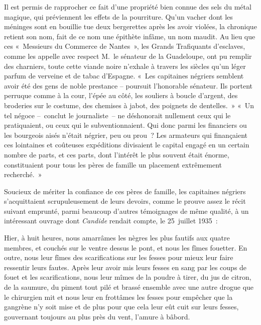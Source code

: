 \documentclass[french,twoside]{book} %
\newenvironment{quoteblock}%
  {\begin{quoting}}
  {\end{quoting}}
\newenvironment{quotebar}{%
    \def\FrameCommand{{\color{rubric!10!}\vrule width 0.5em} \hspace{0.9em}}%
    \def\OuterFrameSep{\itemsep} %
    \MakeFramed {\advance\hsize-\width \FrameRestore}
  }%
  {%
    \endMakeFramed
  }
\renewenvironment{quoteblock}%
  {%
    \savenotes
    \setstretch{0.9}
    \normalfont
    \begin{quotebar}
  }
  {%
    \end{quotebar}
    \spewnotes
  }
\begin{document}
Il est permis de rapprocher ce fait d’une propriété bien connue des sels du métal magique, qui préviennent les effets de la pourriture. Qu’un vacher dont les méninges sont en bouillie tue deux bergerettes après les avoir violées, la chronique retient son nom, fait de ce nom une épithète infâme, un nom maudit. Au lieu que ces « Messieurs du Commerce de Nantes », les Grands Trafiquants d’esclaves, comme les appelle avec respect M. le sénateur de la Guadeloupe, ont pu remplir des charniers, toute cette viande noire n’exhale à travers les siècles qu’un léger parfum de verveine et de tabac d’Espagne. « Les capitaines négriers semblent avoir été des gens de noble prestance – poursuit l’honorable sénateur. Ils portent perruque comme à la cour, l’épée au côté, les souliers à boucle d’argent, des broderies sur le costume, des chemises à jabot, des poignets de dentelles. » « Un tel négoce – conclut le journaliste – ne déshonorait nullement ceux qui le pratiquaient, ou ceux qui le subventionnaient. Qui donc parmi les financiers ou les bourgeois aisés n’était négrier, peu ou prou ? Les armateurs qui finançaient ces lointaines et coûteuses expéditions divisaient le capital engagé en un certain nombre de parts, et ces parts, dont l’intérêt le plus souvent était énorme, constituaient pour tous les pères de famille un placement extrêmement recherché. »\par
Soucieux de mériter la confiance de ces pères de famille, les capitaines négriers s’acquittaient scrupuleusement de leurs devoirs, comme le prouve assez le récit suivant emprunté, parmi beaucoup d’autres témoignages de même qualité, à un intéressant ouvrage dont \emph{Candide} rendait compte, le 25 juillet 1935 :\par

\begin{quoteblock}
 \noindent Hier, à huit heures, nous amarrâmes les nègres les plus fautifs aux quatre membres, et couchés sur le ventre dessus le pont, et nous les fîmes fouetter. En outre, nous leur fîmes des scarifications sur les fesses pour mieux leur faire ressentir leurs fautes. Après leur avoir mis leurs fesses en sang par les coups de fouet et les scarifications, nous leur mîmes de la poudre à tirer, du jus de citron, de la saumure, du piment tout pilé et brassé ensemble avec une autre drogue que le chirurgien mit et nous leur en frottâmes les fesses pour empêcher que la gangrène n’y soit mise et de plus pour que cela leur eût cuit sur leurs fesses, gouvernant toujours au plus près du vent, l’amure à bâbord.
\end{quoteblock}
\end{document}

